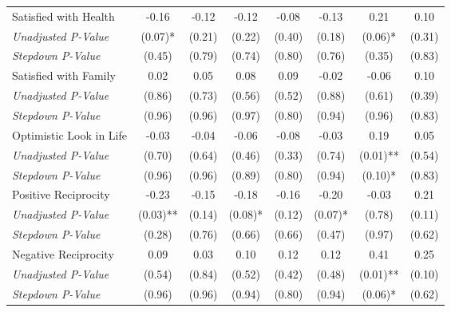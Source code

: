 \begin{tabular}{l c c c c c c c}
Satisfied with Health & -0.16 & -0.12 & -0.12 & -0.08 & -0.13 & 0.21 & 0.10 \\
\quad \textit{Unadjusted P-Value} & (0.07)* & (0.21) & (0.22) & (0.40) & (0.18) & (0.06)* & (0.31) \\
\quad \textit{Stepdown P-Value} & (0.45) & (0.79) & (0.74) & (0.80) & (0.76) & (0.35) & (0.83) \\
Satisfied with Family & 0.02 & 0.05 & 0.08 & 0.09 & -0.02 & -0.06 & 0.10 \\
\quad \textit{Unadjusted P-Value} & (0.86) & (0.73) & (0.56) & (0.52) & (0.88) & (0.61) & (0.39) \\
\quad \textit{Stepdown P-Value} & (0.96) & (0.96) & (0.97) & (0.80) & (0.94) & (0.96) & (0.83) \\
Optimistic Look in Life & -0.03 & -0.04 & -0.06 & -0.08 & -0.03 & 0.19 & 0.05 \\
\quad \textit{Unadjusted P-Value} & (0.70) & (0.64) & (0.46) & (0.33) & (0.74) & (0.01)** & (0.54) \\
\quad \textit{Stepdown P-Value} & (0.96) & (0.96) & (0.89) & (0.80) & (0.94) & (0.10)* & (0.83) \\
Positive Reciprocity & -0.23 & -0.15 & -0.18 & -0.16 & -0.20 & -0.03 & 0.21 \\
\quad \textit{Unadjusted P-Value} & (0.03)** & (0.14) & (0.08)* & (0.12) & (0.07)* & (0.78) & (0.11) \\
\quad \textit{Stepdown P-Value} & (0.28) & (0.76) & (0.66) & (0.66) & (0.47) & (0.97) & (0.62) \\
Negative Reciprocity & 0.09 & 0.03 & 0.10 & 0.12 & 0.12 & 0.41 & 0.25 \\
\quad \textit{Unadjusted P-Value} & (0.54) & (0.84) & (0.52) & (0.42) & (0.48) & (0.01)** & (0.10) \\
\quad \textit{Stepdown P-Value} & (0.96) & (0.96) & (0.94) & (0.80) & (0.94) & (0.06)* & (0.62) \\
\bottomrule
\end{tabular}
